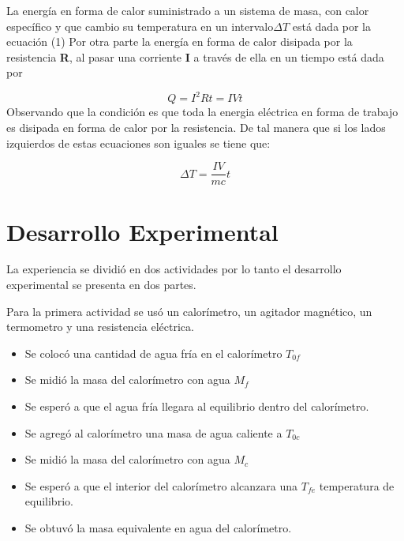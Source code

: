 \documentclass[12pt]{article}
\begin{document}
La energía en forma de calor suministrado a un sistema de masa, con calor específico  y que cambio su temperatura en un intervalo$\Delta T$  está dada por la ecuación (1)
Por otra parte la energía en forma de calor disipada por la resistencia \textbf{R}, al pasar una corriente \textbf{I} a través de ella en un tiempo está dada por

\begin{equation}
Q = I^2 Rt = I V t
\end{equation}
Observando que la condición es que toda la energia eléctrica en forma de
trabajo es disipada en forma de calor por la resistencia. De tal manera
que si los lados izquierdos de estas ecuaciones son iguales se tiene que:
 
 
 \begin{equation}
 \Delta T = \frac{IV}{mc}t
 \end{equation}
 



\vspace{-0.5cm}
\section{Desarrollo Experimental}
\vspace{-0.5cm}
La experiencia se dividió en dos actividades por lo tanto el desarrollo experimental se presenta en dos partes.

Para la primera actividad se usó un calorímetro, un agitador magnético, un termometro y una resistencia eléctrica.
\begin{itemize}
\item Se colocó una cantidad de agua fría en el calorímetro $T_{0f}$
\item Se midió la masa del calorímetro con agua $M_{f}$
\item Se esperó a que el agua fría llegara al equilibrio dentro del calorímetro.
\item Se agregó al calorímetro una masa de agua caliente a $T_{0c}$
\item Se midió la masa del calorímetro con agua $M_{c}$
\item Se esperó a que el interior del calorímetro alcanzara una $T_{fe}$ temperatura
de equilibrio.
\item Se obtuvó la masa equivalente en agua del calorímetro.
\end{itemize}
\end{document}
